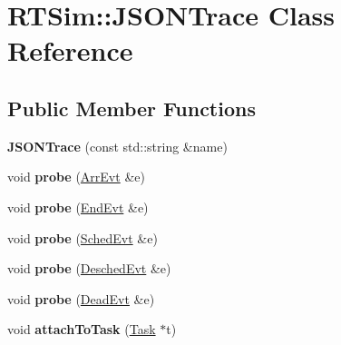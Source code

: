 \hypertarget{classRTSim_1_1JSONTrace}{}\section{R\+T\+Sim\+:\+:J\+S\+O\+N\+Trace Class Reference}
\label{classRTSim_1_1JSONTrace}
\subsection*{Public Member Functions}
\begin{DoxyCompactItemize}
\item 
{\bfseries J\+S\+O\+N\+Trace} (const std\+::string \&name)\hypertarget{classRTSim_1_1JSONTrace_a9766c8605ebf1fee5c167dd8f708a04a}{}\label{classRTSim_1_1JSONTrace_a9766c8605ebf1fee5c167dd8f708a04a}

\item 
void {\bfseries probe} (\hyperlink{classRTSim_1_1ArrEvt}{Arr\+Evt} \&e)\hypertarget{classRTSim_1_1JSONTrace_a79d3c02f6c4ebbc21b5cdec848c481d0}{}\label{classRTSim_1_1JSONTrace_a79d3c02f6c4ebbc21b5cdec848c481d0}

\item 
void {\bfseries probe} (\hyperlink{classRTSim_1_1EndEvt}{End\+Evt} \&e)\hypertarget{classRTSim_1_1JSONTrace_a171857a592b06e65f73dfecfaa382239}{}\label{classRTSim_1_1JSONTrace_a171857a592b06e65f73dfecfaa382239}

\item 
void {\bfseries probe} (\hyperlink{classRTSim_1_1SchedEvt}{Sched\+Evt} \&e)\hypertarget{classRTSim_1_1JSONTrace_a3343d4c4055ac2c8a519d5b9450eb725}{}\label{classRTSim_1_1JSONTrace_a3343d4c4055ac2c8a519d5b9450eb725}

\item 
void {\bfseries probe} (\hyperlink{classRTSim_1_1DeschedEvt}{Desched\+Evt} \&e)\hypertarget{classRTSim_1_1JSONTrace_abb3875e55e09a0262316651d4e938eae}{}\label{classRTSim_1_1JSONTrace_abb3875e55e09a0262316651d4e938eae}

\item 
void {\bfseries probe} (\hyperlink{classRTSim_1_1DeadEvt}{Dead\+Evt} \&e)\hypertarget{classRTSim_1_1JSONTrace_a2e1a4759bc66c2d7aa8e1c7a1911db48}{}\label{classRTSim_1_1JSONTrace_a2e1a4759bc66c2d7aa8e1c7a1911db48}

\item 
void {\bfseries attach\+To\+Task} (\hyperlink{classRTSim_1_1Task}{Task} $\ast$t)\hypertarget{classRTSim_1_1JSONTrace_aa6c0e54d4058c2a4136c054ea587a519}{}\label{classRTSim_1_1JSONTrace_aa6c0e54d4058c2a4136c054ea587a519}

\end{DoxyCompactItemize}
